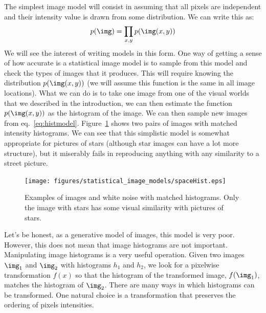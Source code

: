 The simplest image model will consist in assuming that all pixels are independent and their intensity value is drawn from some distribution. We can write this as:
\begin{equation}
p(\img) = \prod_{x,y} p(\img(x,y))
\label{eq:histmodel}
\end{equation}
We will see the interest of writing models in this form. One way of getting a sense of how accurate is a statistical image model is to sample from this model and check the types of images that it produces. This will require knowing the distribution $p(\img(x,y))$ (we will assume this function is the same in all image locations). What we can do is to take one image from one of the visual worlds that we described in the introduction, we can then estimate the function $p(\img(x,y))$ as the histogram of the image. We can then sample new images from eq.~\ref{eq:histmodel}.  Figure~\ref{fig:histMatch} shows two pairs of images with matched intensity histograms. We can see that this simplistic model is somewhat appropriate for pictures of stars (although star images can have a lot more structure), but it miserably fails in reproducing anything with any similarity to a street picture. 


\begin{figure}[htpb]
\centerline{
\texttt{[image: figures/statistical\_image\_models/spaceHist.eps]}
} 
\caption{Examples of images and white noise with matched histograms. Only the image with stars has some visual similarity with pictures of stars.} 
\label{fig:histMatch}
\end{figure}

Let's be honest, as a generative model of images, this model is very poor. However, this does not mean that image histograms are not important. Manipulating image histograms is a very useful operation.  Given two images $\img_1$ and $\img_2$ with histograms $h_1$ and $h_2$, we look for a pixelwise transformation $f(x)$ so that the histogram of the transformed image, $f(\img_1)$, matches the histogram of $\img_2$. There are many ways in which histograms can be transformed. One natural choice is a transformation that preserves the ordering of pixels intensities. 
%
%
%
%
%
%
%

